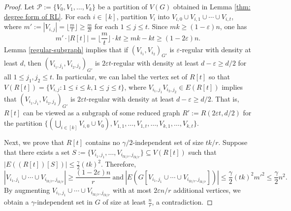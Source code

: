 \documentclass[11pt, a4paper]{article}
\theoremstyle{definition}
\newcommand{\eps}{\varepsilon}
\newcommand{\<}{\subseteq}
\begin{document}
\begin{proof}
Let $\mathcal{P}:=\{V_0,V_1, \dots,V_k\}$ be a partition of  $V(G)$ obtained in Lemma \ref{thm: degree form of RL}. For each $i\in [k]$, partition $V_i$ into $V_{i,0}\cup V_{i,1}\cup \cdots\cup V_{i,t}$, where $m':=|V_{i,j}|=\lfloor\frac{m}{t}\rfloor\geq \frac{m}{2t}$ for each $1\leq j\leq t$. Since $mk\geq (1-\eps)n$, one has
$$
m'\cdot |R[t]|=\lfloor\frac{m}{t}\rfloor\cdot kt\geq mk-kt\geq (1-2\eps)n.
$$
Lemma \ref{regular-subgraph} implies that if $(V_{i_1},V_{i_2})_{G'}$ is $\eps$-regular with density at least $d$, then $(V_{i_1,j_1},V_{i_2,j_2})_{G'}$ is $2\eps t$-regular with density at least $d-\eps\geq d/2$ for all $1\leq j_1,j_2\leq t$. In particular, we can label the vertex set of $R[t]$ so that $V(R[t])=\{V_{i,j}:1\leq i\leq k,1\leq j\leq t\}$, where $V_{i_1,j_1}V_{i_2,j_2}\in E(R[t])$ implies that $(V_{i_1,j_1},V_{i_2,j_2})_{G'}$ is $2\eps t$-regular with density at least $d-\eps\geq d/2$. That is, $R[t]$ can be viewed as a subgraph of some reduced graph $R':=R(2\eps t,d/2)$ for the partition $\big\{(\bigcup_{i\in [k]}V_{i,0}\cup V_0), V_{1,1}, \ldots,  V_{1,t},\ldots, V_{k,1}, \ldots,  V_{k,t}\big\}$.%

    Next, we prove that $R[t]$ contains no ${\gamma}/2$-independent set of size $t{k}/{r}$.  Suppose that %
    there exists a set $S:=\{V_{i_1,j_1},\ldots,V_{i_{{tk}/{r}},j_{{tk}/{r}}}\}\subseteq V(R[t])$ such that $|E((R[t])[S])|\leq \frac{\gamma}{2} (tk)^2$. Therefore, 
    $$
    |V_{i_1,j_1}\cup \cdots\cup V_{i_{{tk}/{r}},j_{{tk}/{r}}}|\geq \frac{(1-2\eps)n}{r}\ \text{and}\ |E(G[V_{i_1,j_1}\cup \cdots\cup V_{i_{{tk}/{r}},j_{{tk}/{r}}}])|\leq \frac{{\gamma}}{2} (tk)^2m'^2\leq \frac{{\gamma}}{2} n^2. 
    $$
     By augmenting $V_{i_1,j_1}\cup \cdots\cup V_{i_{{tk}/{r}},j_{{tk}/{r}}}$ with at most $2\eps n/r$ additional vertices, we obtain a $\gamma$-independent set in $G$ of size at least $\frac{n}{r}$, 
    a contradiction. 
\end{proof}
\end{document}
